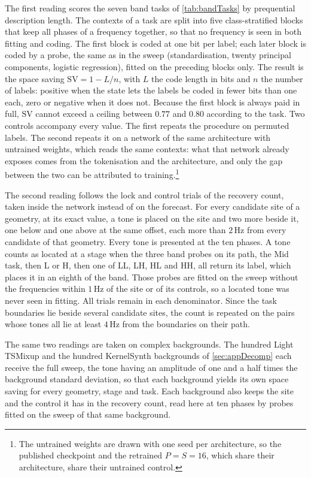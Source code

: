 {The first reading scores the seven band tasks of \autoref{tab:bandTasks} by prequential description length\autocite{voitaInformationTheoreticProbingMinimum2020}. The contexts of a task are split into five class-stratified blocks that keep all phases of a frequency together, so that no frequency is seen in both fitting and coding. The first block is coded at one bit per label; each later block is coded by a probe, the same as in the sweep (standardisation, twenty principal components, logistic regression), fitted on the preceding blocks only. The result is the space saving $\mathrm{SV}=1-L/n$, with $L$ the code length in bits and $n$ the number of labels: positive when the state lets the labels be coded in fewer bits than one each, zero or negative when it does not. Because the first block is always paid in full, $\mathrm{SV}$ cannot exceed a ceiling between $0.77$ and $0.80$ according to the task. Two controls accompany every value. The first repeats the procedure on permuted labels. The second repeats it on a network of the same architecture with untrained weights, which reads the same contexts: what that network already exposes comes from the tokenisation and the architecture, and only the gap between the two can be attributed to training.\footnote{\color{red}The untrained weights are drawn with one seed per architecture, so the published checkpoint and the retrained $P=S=16$, which share their architecture, share their untrained control.}

The second reading follows the lock and control trials of the recovery count, taken inside the network instead of on the forecast. For every candidate site of a geometry, at its exact value, a tone is placed on the site and two more beside it, one below and one above at the same offset, each more than $2$\,Hz from every candidate of that geometry. Every tone is presented at the ten phases. A tone counts as located at a stage when the three band probes on its path, the Mid task, then L or H, then one of LL, LH, HL and HH, all return its label, which places it in an eighth of the band. Those probes are fitted on the sweep without the frequencies within $1$\,Hz of the site or of its controls, so a located tone was never seen in fitting. All trials remain in each denominator. Since the task boundaries lie beside several candidate sites, the count is repeated on the pairs whose tones all lie at least $4$\,Hz from the boundaries on their path.

The same two readings are taken on complex backgrounds. The hundred Light TSMixup and the hundred KernelSynth backgrounds of \autoref{sec:appDecomp} each receive the full sweep, the tone having an amplitude of one and a half times the background standard deviation, so that each background yields its own space saving for every geometry, stage and task. Each background also keeps the site and the control it has in the recovery count, read here at ten phases by probes fitted on the sweep of that same background.

}
